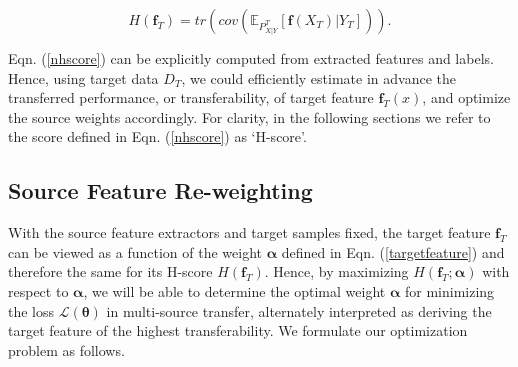 \documentclass[letterpaper]{article} %
\begin{document}
\begin{equation}
    H(\boldsymbol{f}_T) = tr(cov(\mathbb{E}_{P_{X|Y}^T}[\boldsymbol{f}(X_T)|Y_T])).
    \label{nhscore}
\end{equation}

 Eqn. (\ref{nhscore}) can be explicitly computed from extracted features and labels. Hence, using target data $D_T$, we could efficiently estimate in advance the transferred performance, or transferability, of target feature $\boldsymbol{f}_T(x)$, and optimize the source weights accordingly. 
For clarity, in the following sections we refer to the score defined in Eqn. (\ref{nhscore}) as `H-score'.





\subsection{Source Feature Re-weighting}

With the source feature extractors and target samples fixed, the target feature $\boldsymbol{f}_T$ can be viewed as a function of the weight $\boldsymbol{\alpha}$ defined in Eqn. (\ref{targetfeature}) and therefore the same for its H-score $H(\boldsymbol{f}_T)$. Hence, by maximizing $H(\boldsymbol{f}_T; \boldsymbol{\alpha})$ with respect to $\boldsymbol{\alpha}$, we will be able to determine the optimal weight $\boldsymbol{\alpha}$ for minimizing the loss $\mathcal L(\boldsymbol{\theta})$ in multi-source transfer, alternately interpreted as deriving the target feature of the highest transferability. We formulate our optimization problem as follows. 
\end{document}
